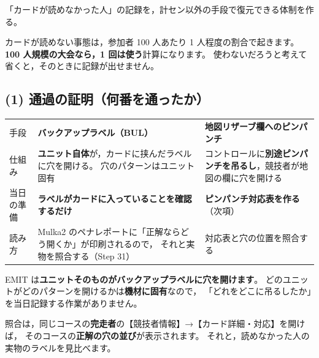 
\begin{Goal}
「カードが読めなかった人」の記録を，計セン以外の手段で復元できる体制を作る。
\end{Goal}

\begin{Note}
カードが読めない事態は，参加者 100 人あたり 1 人程度の割合で起きます。
\textbf{100 人規模の大会なら，1 回は使う}計算になります。
使わないだろうと考えて省くと，そのときに記録が出せません。
\end{Note}

\subsection*{(1) 通過の証明（何番を通ったか）}

\begin{center}
\small
\begin{tabular}{@{}P{20mm}P{58mm}P{62mm}@{}}
\toprule
 & \hd{\tEMIT} & \hd{\tSI\ \tSIAC} \\
\midrule
手段 & \textbf{バックアップラベル（BUL）} & \textbf{地図リザーブ欄へのピンパンチ} \\
仕組み & \textbf{ユニット自体}が，カードに挟んだラベルに穴を開ける。
  穴のパターンはユニット固有
  & コントロールに\textbf{別途ピンパンチを吊るし}，競技者が地図の欄に穴を開ける \\
当日の準備 & \textbf{ラベルがカードに入っていることを確認するだけ}
  & \textbf{ピンパンチ対応表を作る}（次項） \\
読み方 & Mulka2 のペナレポートに「正解ならどう開くか」が印刷されるので，
  それと実物を照合する（Step 31）
  & 対応表と穴の位置を照合する \\
\bottomrule
\end{tabular}
\end{center}

\begin{Note}
EMIT は\textbf{ユニットそのものがバックアップラベルに穴を開けます}。
どのユニットがどのパターンを開けるかは\textbf{機材に固有}なので，
「どれをどこに吊るしたか」を当日記録する作業がありません。

照合は，同じコースの\textbf{完走者}の【競技者情報】→【カード詳細・対応】を開けば，
そのコースの\textbf{正解の穴の並び}が表示されます。
それと，読めなかった人の実物のラベルを見比べます。
\end{Note}

